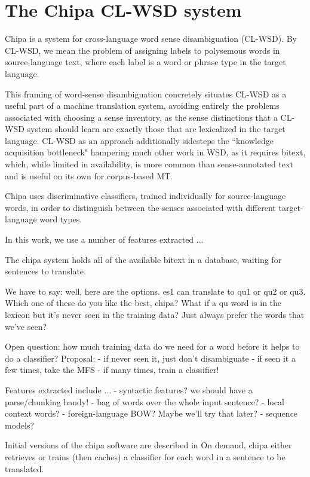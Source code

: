 \documentclass[10pt, a4paper]{article}
\begin{document}
\section{The Chipa CL-WSD system}
Chipa is a system for cross-language word sense disambiguation (CL-WSD). By
CL-WSD, we mean the problem of assigning labels to polysemous words in
source-language text, where each label is a word or phrase type in the target
language.

This framing of word-sense disambiguation concretely situates CL-WSD as a
useful part of a machine translation system, avoiding entirely the problems
associated with choosing a sense inventory, as the sense distinctions that a
CL-WSD system should learn are exactly those that are lexicalized in the target
language. CL-WSD as an approach additionally sidesteps the ``knowledge
acquisition bottleneck"
\cite{agirre2006word}
hampering much other work in WSD, as it requires bitext, which, while limited
in availability, is more common than sense-annotated text and is useful on its
own for corpus-based MT.

Chipa uses discriminative classifiers, trained individually for source-language
words, in order to distinguish between the senses associated with different
target-language word types.

In this work, we use a number of features extracted ...

The chipa system holds all of the available bitext in a database, waiting for
sentences to translate.


We have to say: well, here are the options. es1 can translate to qu1 or qu2 or
qu3. Which one of these do you like the best, chipa?
What if a qu word is in the lexicon but it's never seen in the training data?
Just always prefer the words that we've seen?


Open question: how much training data do we need for a word before it helps to
do a classifier?
Proposal:
- if never seen it, just don't disambiguate
- if seen it a few times, take the MFS
- if many times, train a classifier!



Features extracted include ...
- syntactic features? we should have a parse/chunking handy!
- bag of words over the whole input sentence?
- local context words?
- foreign-language BOW? Maybe we'll try that later?
- sequence models?




Initial versions of the chipa software are described in
\cite{rudnick-gasser:2013:HyTra}
On demand, chipa either retrieves or trains (then caches) a classifier
for each word in a sentence to be translated.
\end{document}
